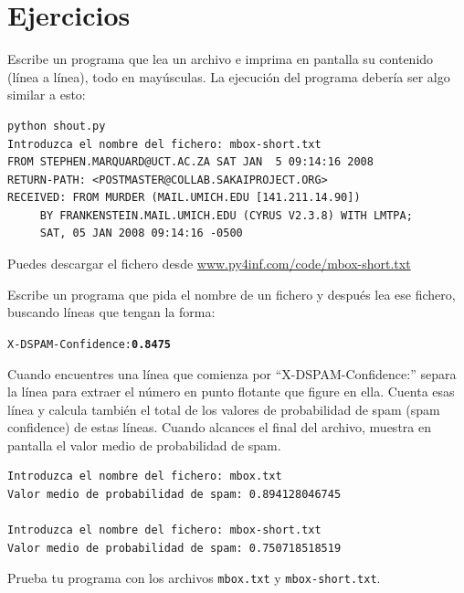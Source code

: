 \section{Ejercicios}

\begin{ex}
Escribe un programa que lea un archivo e imprima en pantalla su contenido
(línea a línea), todo en mayúsculas. La ejecución del programa debería
ser algo similar a esto:

\beforeverb
\begin{verbatim}
python shout.py
Introduzca el nombre del fichero: mbox-short.txt
FROM STEPHEN.MARQUARD@UCT.AC.ZA SAT JAN  5 09:14:16 2008
RETURN-PATH: <POSTMASTER@COLLAB.SAKAIPROJECT.ORG>
RECEIVED: FROM MURDER (MAIL.UMICH.EDU [141.211.14.90])
	 BY FRANKENSTEIN.MAIL.UMICH.EDU (CYRUS V2.3.8) WITH LMTPA;
	 SAT, 05 JAN 2008 09:14:16 -0500
\end{verbatim}
\afterverb
%
Puedes descargar el fichero desde
\url{www.py4inf.com/code/mbox-short.txt}
\end{ex}

\begin{ex}
Escribe un programa
que pida el nombre de un fichero y después lea ese fichero,
buscando líneas que tengan la forma:

\beforeverb
\begin{alltt}
X-DSPAM-Confidence: {\bf 0.8475}
\end{alltt}
\afterverb

Cuando encuentres una línea que comienza por
``X-DSPAM-Confidence:'' separa la línea para extraer
el número en punto flotante que figure en ella. Cuenta esas línea y
calcula también el total de los valores de probabilidad de spam (spam confidence)
de estas líneas. Cuando alcances el final del archivo, muestra en pantalla
el valor medio de probabilidad de spam.

\beforeverb
\begin{verbatim}
Introduzca el nombre del fichero: mbox.txt
Valor medio de probabilidad de spam: 0.894128046745

Introduzca el nombre del fichero: mbox-short.txt
Valor medio de probabilidad de spam: 0.750718518519
\end{verbatim}
\afterverb
%
Prueba tu programa con los archivos {\tt mbox.txt} y {\tt mbox-short.txt}.
\end{ex}


